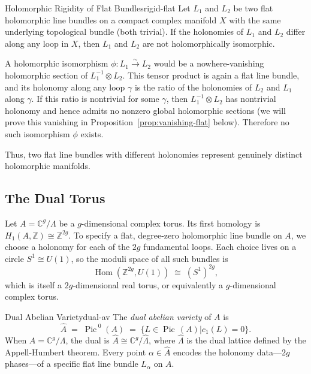 \documentclass{article}
\newcommand{\C}{{\mathbb{C}}}
\newcommand{\Z}{{\mathbb{Z}}}
\newcommand{\Hom}{{\operatorname{Hom}}}
\newcommand{\Pic}{{\operatorname{Pic}\,}}
\renewcommand{\mid}{\big|}
\let\temp\phi
\let\phi\varphi
\let\varphi\temp
\begin{document}
\begin{prop}{Holomorphic Rigidity of Flat Bundles}{rigid-flat}
Let $L_1$ and $L_2$ be two flat holomorphic line bundles on a compact complex manifold $X$ with the same underlying topological bundle (both trivial). If the holonomies of $L_1$ and $L_2$ differ along any loop in $X$, then $L_1$ and $L_2$ are not holomorphically isomorphic.
\end{prop}

\begin{Proof}
A holomorphic isomorphism $\varphi\colon L_1 \xrightarrow{\sim} L_2$ would be a nowhere-vanishing holomorphic section of $L_1^{-1} \otimes L_2$. This tensor product is again a flat line bundle, and its holonomy along any loop $\gamma$ is the ratio of the holonomies of $L_2$ and $L_1$ along $\gamma$. If this ratio is nontrivial for some $\gamma$, then $L_1^{-1} \otimes L_2$ has nontrivial holonomy and hence admits no nonzero global holomorphic sections (we will prove this vanishing in Proposition~\ref{prop:vanishing-flat} below). Therefore no such isomorphism $\varphi$ exists.
\end{Proof}

Thus, two flat line bundles with different holonomies represent genuinely distinct holomorphic manifolds.

\subsection{The Dual Torus}

Let $A = \C^g / \Lambda$ be a $g$-dimensional complex torus. Its first homology is $H_1(A, \Z) \cong \Z^{2g}$. To specify a flat, degree-zero holomorphic line bundle on $A$, we choose a holonomy for each of the $2g$ fundamental loops. Each choice lives on a circle $S^1 \cong U(1)$, so the moduli space of all such bundles is
\[
    \Hom(\Z^{2g}, U(1)) \;\cong\; (S^1)^{2g},
\]
which is itself a $2g$-dimensional real torus, or equivalently a $g$-dimensional complex torus.

\begin{defn}{Dual Abelian Variety}{dual-av}
The \emph{dual abelian variety} of $A$ is
\[
    \hat{A} \;=\; \Pic^0(A) \;=\; \{ L \in \Pic(A) \mid c_1(L) = 0 \}.
\]
When $A = \C^g / \Lambda$, the dual is $\hat{A} \cong \C^g / \hat{\Lambda}$, where $\hat{\Lambda}$ is the dual lattice defined by the Appell-Humbert theorem. Every point $\alpha \in \hat{A}$ encodes the holonomy data---$2g$ phases---of a specific flat line bundle $L_\alpha$ on $A$.
\end{defn}
\end{document}

